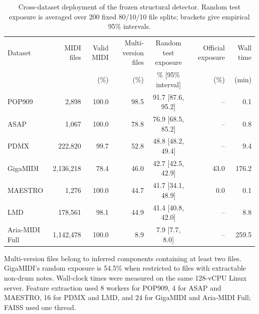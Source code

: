 \begin{table}[t]
\centering
\caption{Cross-dataset deployment of the frozen structural detector. Random test exposure is averaged over 200 fixed 80/10/10 file splits; brackets give empirical 95\% intervals.}
\label{tab:cross-dataset-detector}
\footnotesize
\begin{tabular*}{\textwidth}{@{\extracolsep{\fill}}lrrrcrr}
\toprule
Dataset & MIDI files & Valid MIDI & Multi-version files & Random test exposure & Official exposure & Wall time \\
 & & (\%) & (\%) & \% [95\% interval] & (\%) & (min) \\
\midrule
POP909 & 2,898 & 100.0 & 98.5 & 91.7 [87.6, 95.2] & -- & 0.1 \\
ASAP & 1,067 & 100.0 & 78.8 & 76.9 [68.5, 85.2] & -- & 0.8 \\
PDMX & 222,820 & 99.7 & 52.8 & 48.8 [48.2, 49.4] & -- & 9.4 \\
GigaMIDI & 2,136,218 & 78.4 & 46.0 & 42.7 [42.5, 42.9] & 43.0 & 176.2 \\
MAESTRO & 1,276 & 100.0 & 44.7 & 41.7 [34.1, 48.9] & 0.0 & 0.1 \\
LMD & 178,561 & 98.1 & 44.9 & 41.4 [40.8, 42.0] & -- & 8.8 \\
Aria-MIDI Full & 1,142,478 & 100.0 & 8.9 & 7.9 [7.7, 8.0] & -- & 259.5 \\
\bottomrule
\end{tabular*}
\vspace{2pt}
\parbox{\textwidth}{\footnotesize Multi-version files belong to inferred components containing at least two files. GigaMIDI's random exposure is 54.5\% when restricted to files with extractable non-drum notes. Wall-clock times were measured on the same 128-vCPU Linux server. Feature extraction used 8 workers for POP909, 4 for ASAP and MAESTRO, 16 for PDMX and LMD, and 24 for GigaMIDI and Aria-MIDI Full; FAISS used one thread.}
\end{table}
